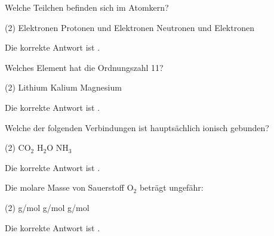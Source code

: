\begin{exercise}[subtitle=Atombau, points=0.5, Punkt=0.5] 
Welche Teilchen befinden sich im Atomkern?
\begin{choices}(2) %
  \task Elektronen
  \task {}
  \task Protonen und Elektronen
  \task Neutronen und Elektronen
\end{choices}
\begin{solution}
Die korrekte Antwort ist \textbf{}.
\end{solution}
\end{exercise}

\begin{exercise}[subtitle=Periodensystem, points=0.5, Punkt=0.5] %
Welches Element hat die Ordnungszahl 11?
\begin{choices}(2)
  \task Lithium
  \task Kalium
  \task \answerNatrium
  \task Magnesium
\end{choices}
\begin{solution}
Die korrekte Antwort ist \textbf{}.
\end{solution}
\end{exercise}

\begin{exercise}[subtitle=Ionische Bindung, points=0.5, Punkt=0.5]
Welche der folgenden Verbindungen ist hauptsächlich ionisch gebunden?
\begin{choices}(2)
  \task \(\mathrm{CO_2}\)
  \task \(\mathrm{H_2O}\)
  \task \(\mathrm{NH_3}\)
  \task {}
\end{choices}
\begin{solution}
Die korrekte Antwort ist \textbf{}.
\end{solution}
\end{exercise}

\begin{exercise}[subtitle=Atommassen, points=0.5, Punkt=0.5]
Die molare Masse von Sauerstoff \(\mathrm{O_2}\) beträgt ungefähr:
\begin{choices}(2)
   g/mol
  \task {}
   g/mol
   g/mol
\end{choices}
\begin{solution}
Die korrekte Antwort ist \textbf{}.
\end{solution}
\end{exercise}

